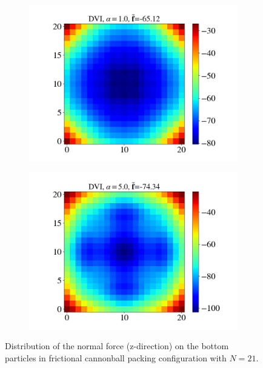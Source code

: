 \begin{itemize}
\begin{figure}[H]
\begin{subfigure}{0.32\columnwidth}
			\includegraphics[width=1.0\textwidth]{images/CD/Example7/20/N_21_DVI_1.0.png}
		\end{subfigure}
		\begin{subfigure}{0.32\columnwidth}	
			\centering
			\includegraphics[width=1.0\textwidth]{images/CD/Example7/20/N_21_DVI_5.0.png}
		\end{subfigure}
		\caption{Distribution of the normal force (z-direction) on the bottom particles in frictional cannonball packing configuration with $N=21$.}\label{fig:cbp_fp_N=21}
	\end{figure}
	

\end{itemize}
